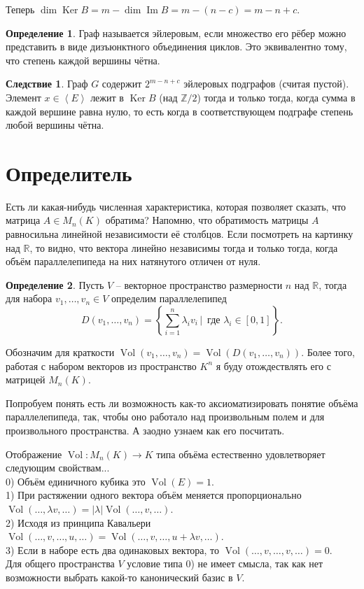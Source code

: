 \documentclass[10pt,a4paper,oneside]{book}
\theoremstyle{definition}
\newtheorem*{defn}{Определение}
\newtheorem{cor}{Следствие}
\newcommand{\mb}[1]{\mathbb{#1}}
\newcommand{\Vol}{\operatorname{Vol}}
\DeclareMathOperator{\Ker}{Ker}
\renewcommand{\Im}{\operatorname{Im}}
\def\lan{\left\langle }
\def\ran{\right\rangle}
\def\dfn{\begin{defn}}
\def\edfn{\end{defn}}
\def\crl{\begin{cor}}
\def\ecrl{\end{cor}}
\begin{document}
Теперь $\dim \Ker B = m - \dim \Im B= m - (n-c)= m-n +c$.
\endproof

\dfn Граф называется эйлеровым, если множество его рёбер можно представить в виде дизъюнктного объединения циклов. Это эквивалентно тому, что степень каждой вершины чётна.
\edfn

\crl Граф $G$ содержит $2^{m-n+c}$ эйлеровых подграфов (считая пустой).
\proof Элемент $x \in \lan E \ran $ лежит в $\Ker B$ (над $\mb Z/2$) тогда и только тогда, когда сумма в каждой вершине равна нулю, то есть когда в соответствующем подграфе степень любой вершины чётна.
\endproof
\ecrl


\section{Определитель}

Есть ли какая-нибудь численная характеристика, которая позволяет сказать, что матрица $A\in M_n(K)$ обратима? Напомню, что обратимость матрицы $A$ равносильна линейной независимости её столбцов. Если посмотреть на картинку над $\mb R$, то видно, что вектора линейно независимы тогда и только тогда, когда объём параллелепипеда на них натянутого отличен от нуля.

\dfn Пусть $V$ -- векторное пространство размерности $n$ над $\mb R$, тогда для набора  $v_1,\dots,v_n \in V$ определим параллелепипед
$$D(v_1,\dots,v_n)=\left\{\sum_{i=1}^n \lambda_i v_i\,|\, \text{ где } \lambda_i\in [0,1]\right\}.$$
\edfn


Обозначим для краткости $\Vol(v_1,\dots,v_n)= \Vol (D(v_1,\dots,v_n))$. Более того, работая с набором векторов из пространство $K^n$ я буду отождествлять его с матрицей $M_n(K)$. 

Попробуем понять есть ли возможность как-то аксиоматизировать понятие объёма параллелепипеда, так, чтобы оно работало над произвольным полем и для произвольного пространства. А заодно узнаем как его посчитать.

Отображение $\Vol \colon M_n(K) \to K$ типа объёма естественно удовлетворяет следующим свойствам...\\
0) Объём единичного кубика это $\Vol(E)=1$.\\
1) При растяжении одного вектора объём меняется пропорционально $\Vol(\dots,\lambda v,\dots)=|\lambda|\Vol(\dots,v,\dots)$.\\
2) Исходя из принципа Кавальери $\Vol(\dots,v,\dots,u,\dots)=\Vol(\dots,v,\dots,u+\lambda v,\dots)$.\\
3) Если в наборе есть два одинаковых вектора, то $\Vol(\dots,v, \dots, v,\dots)=0$.\\
Для общего пространства $V$ условие типа 0) не имеет смысла, так как нет возможности выбрать какой-то канонический базис в $V$.
\end{document}
